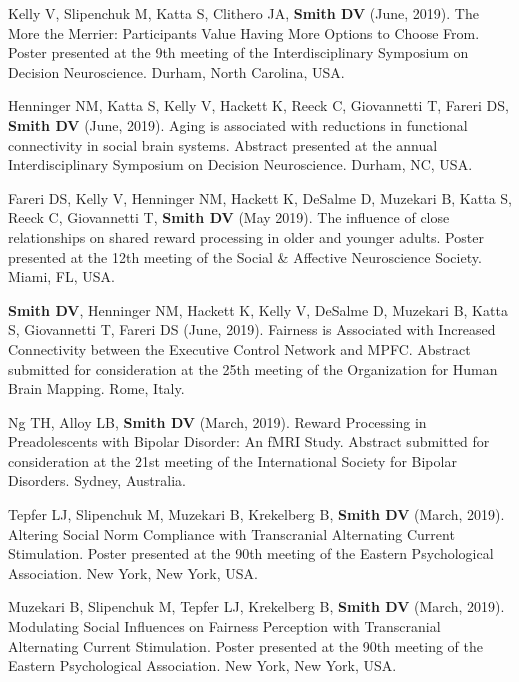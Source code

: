 \documentclass[11pt, letterpaper]{article}
\begin{document}
\begin{hangparas}{.5in}{1}
Kelly V, Slipenchuk M, Katta S, Clithero JA, \textbf{Smith DV} (June, 2019). The More the Merrier: Participants Value Having More Options to Choose From. Poster presented at the 9th meeting of the Interdisciplinary Symposium on Decision Neuroscience. Durham, North Carolina, USA.

Henninger NM, Katta S, Kelly V, Hackett K,  Reeck C, Giovannetti T, Fareri DS, \textbf{Smith DV} (June, 2019). Aging is associated with reductions in functional connectivity in social brain systems. Abstract presented at the annual Interdisciplinary Symposium on Decision Neuroscience. Durham, NC, USA.

Fareri DS, Kelly V, Henninger NM, Hackett K, DeSalme D, Muzekari B, Katta S, Reeck C, Giovannetti T, \textbf{Smith DV} (May 2019). The influence of close relationships on shared reward processing in older and younger adults. Poster presented at the 12th meeting of the Social \& Affective Neuroscience Society. Miami, FL, USA.

\textbf{Smith DV}, Henninger NM, Hackett K, Kelly V, DeSalme D, Muzekari B, Katta S, Giovannetti T, Fareri DS (June, 2019). Fairness is Associated with Increased Connectivity between the Executive Control Network and MPFC. Abstract submitted for consideration at the 25th meeting of the Organization for Human Brain Mapping. Rome, Italy.

Ng TH, Alloy LB, \textbf{Smith DV} (March, 2019). Reward Processing in Preadolescents with Bipolar Disorder: An fMRI Study. Abstract submitted for consideration at the 21st meeting of the International Society for Bipolar Disorders. Sydney, Australia.

Tepfer LJ, Slipenchuk M, Muzekari B, Krekelberg B, \textbf{Smith DV} (March, 2019). Altering Social Norm Compliance with Transcranial Alternating Current Stimulation. Poster presented at the 90th meeting of the Eastern Psychological Association. New York, New York, USA.

Muzekari B, Slipenchuk M, Tepfer LJ, Krekelberg B, \textbf{Smith DV} (March, 2019). Modulating Social Influences on Fairness Perception with Transcranial Alternating Current Stimulation. Poster presented at the 90th meeting of the Eastern Psychological Association. New York, New York, USA. \\

\end{hangparas}
\end{document}
